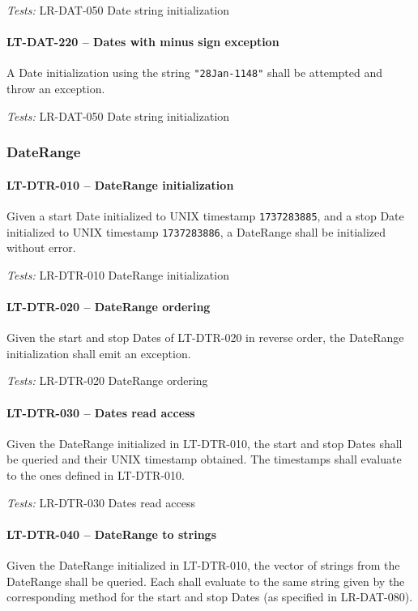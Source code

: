 \textit{Tests: } LR-DAT-050 Date string initialization

\paragraph{LT-DAT-220 -- Dates with minus sign exception}
A Date initialization using the string \lstinline{"28Jan-1148"}
shall be attempted and throw an exception.

\textit{Tests: } LR-DAT-050 Date string initialization

\subsubsection{DateRange}
\paragraph{LT-DTR-010 -- DateRange initialization}
Given a start Date initialized to UNIX timestamp \lstinline{1737283885},
and a stop Date initialized to UNIX timestamp \lstinline{1737283886},
a DateRange shall be initialized without error.

\textit{Tests: } LR-DTR-010 DateRange initialization

\paragraph{LT-DTR-020 -- DateRange ordering}
Given the start and stop Dates of LT-DTR-020 in reverse order,
the DateRange initialization shall emit an exception.

\textit{Tests: } LR-DTR-020 DateRange ordering

\paragraph{LT-DTR-030 -- Dates read access}
Given the DateRange initialized in LT-DTR-010, the start and stop
Dates shall be queried and their UNIX timestamp obtained.
The timestamps shall evaluate to the ones defined in LT-DTR-010.

\textit{Tests: } LR-DTR-030 Dates read access

\paragraph{LT-DTR-040 -- DateRange to strings}
Given the DateRange initialized in LT-DTR-010, the vector of
strings from the DateRange shall be queried. Each shall evaluate
to the same string given by the corresponding method for the start and stop
Dates (as specified in LR-DAT-080).

